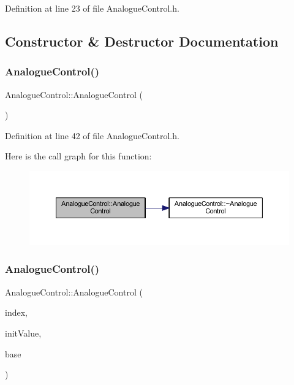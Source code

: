Definition at line 23 of file Analogue\+Control.\+h.



\subsection{Constructor \& Destructor Documentation}
\mbox{\label{class_analogue_control_aad4d11c644df1b2b31e32333aceb5d1a}} 
\subsubsection{\texorpdfstring{Analogue\+Control()}{AnalogueControl()}\hspace{0.1cm}{\footnotesize\ttfamily [1/3]}}
{\footnotesize\ttfamily Analogue\+Control\+::\+Analogue\+Control (\begin{DoxyParamCaption}{ }\end{DoxyParamCaption})\hspace{0.3cm}{\ttfamily [inline]}}



Definition at line 42 of file Analogue\+Control.\+h.

Here is the call graph for this function\+:
\nopagebreak
\begin{figure}[H]
\begin{center}
\leavevmode
\includegraphics[width=350pt]{dc/daa/class_analogue_control_aad4d11c644df1b2b31e32333aceb5d1a_cgraph}
\end{center}
\end{figure}
\mbox{\label{class_analogue_control_a58826c0582ce0697d1c03a92991a648c}} 
\subsubsection{\texorpdfstring{Analogue\+Control()}{AnalogueControl()}\hspace{0.1cm}{\footnotesize\ttfamily [2/3]}}
{\footnotesize\ttfamily Analogue\+Control\+::\+Analogue\+Control (\begin{DoxyParamCaption}\item[{unsigned char}]{index,  }\item[{unsigned char}]{init\+Value,  }\item[{\hyperlink{class_analogue_control_base}{Analogue\+Control\+Base} $\ast$}]{base }\end{DoxyParamCaption})}



